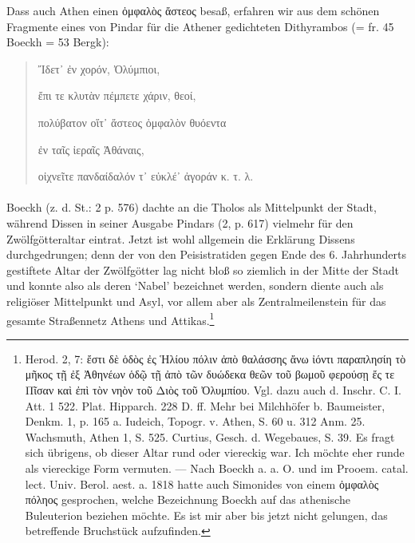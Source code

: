\documentclass[a4paper, 11pt, oneside]{article}
\begin{document}
Dass auch Athen einen ὀμφαλὸς ἄστεος besaß, erfahren wir aus dem schönen Fragmente eines von Pindar für die Athener gedichteten Dithyrambos (= fr. 45 Boeckh = 53 Bergk):
\begin{quotation}
Ἴδετ᾽ ἐν χορόν, Ὀλύμπιοι,

ἔπι τε κλυτὰν πέμπετε χάριν, θεοί,

πολύβατον οἵτ᾽ ἄστεος ὀμφαλὸν θυόεντα

ἐν ταῖς ἰεραῖς Ἀθάναις,

οἰχνεῖτε πανδαίδαλόν τ᾽ εὐκλέ᾽ ἀγοράν κ. τ. λ.
\end{quotation}
\paragraph{}
Boeckh (z. d. St.: 2 p. 576) dachte an die Tholos als Mittelpunkt der Stadt, während Dissen in seiner Ausgabe Pindars (2, p. 617) vielmehr für den Zwölfgötteraltar eintrat. Jetzt ist wohl allgemein die Erklärung Dissens durchgedrungen; denn der von den Peisistratiden gegen Ende des 6. Jahrhunderts gestiftete Altar der Zwölfgötter lag nicht bloß so ziemlich in der Mitte der Stadt und konnte also als deren `Nabel' bezeichnet werden, sondern diente auch als religiöser Mittelpunkt und Asyl, vor allem aber als Zentralmeilenstein für das gesamte Straßennetz Athens und Attikas.\footnote{Herod. 2, 7: ἔστι δὲ ὁδὸς ἐς Ἡλίου πόλιν ἀπὸ θαλάσσης ἄνω ἰόντι παραπλησίη τὸ μῆκος τῇ ἐξ Ἀθηνέων ὁδῷ τῇ ἀπὸ τῶν δυώδεκα θεῶν τοῦ βωμοῦ φερούσῃ ἔς τε Πῖσαν καὶ ἐπὶ τὸν νηὸν τοῦ Διὸς τοῦ Ὀλυμπίου. Vgl. dazu auch d. Inschr. C. I. Att. 1 522. Plat. Hipparch. 228 D. ff. Mehr bei Milchhöfer b. Baumeister, Denkm. 1, p. 165 a. Iudeich, Topogr. v. Athen, S. 60 u. 312 Anm. 25. Wachsmuth, Athen 1, S. 525. Curtius, Gesch. d. Wegebaues, S. 39. Es fragt sich übrigens, ob dieser Altar rund oder viereckig war. Ich möchte eher runde als viereckige Form vermuten. --- Nach Boeckh a. a. O. und im Prooem. catal. lect. Univ. Berol. aest. a. 1818 hatte auch Simonides von einem ὀμφαλὸς πόληος gesprochen, welche Bezeichnung Boeckh auf das athenische Buleuterion beziehen möchte. Es ist mir aber bis jetzt nicht gelungen, das betreffende Bruchstück aufzufinden.}
\end{document}
